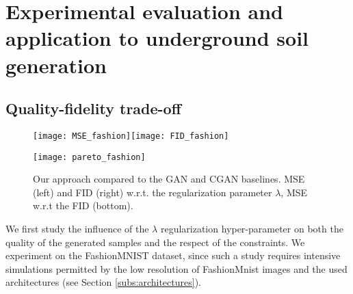\section{Experimental evaluation and application to underground soil generation}

\subsection{Quality-fidelity trade-off}



\begin{figure}[t]
	\centering
	\texttt{[image: MSE\_fashion]}\texttt{[image: FID\_fashion]}
	
	\texttt{[image: pareto\_fashion]}
	
	\centering
	\caption{Our approach compared to the GAN and CGAN baselines. MSE (left) and  FID (right) w.r.t. the regularization parameter $\lambda$, MSE w.r.t the FID (bottom).
	}
	\label{fig:fids}
	\label{fig:mses}
	\label{fig:paretos}
\end{figure}

We first study the influence of the $\lambda$ regularization hyper-parameter on both the quality of the generated samples and the respect of the constraints. We experiment on the %
FashionMNIST \citep{Xiao2017} dataset, since such a study requires intensive simulations permitted by the low resolution of FashionMnist images and the used architectures (see Section \ref{subs:architectures}). 

